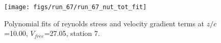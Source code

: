 \begin{figure}[H]
\centering
\texttt{[image: figs/run\_67/run\_67\_nut\_tot\_fit]}
\caption{Polynomial fits of reynolds stress and velocity gradient terms at $z/c$=10.00, $V_{free}$=27.05, station 7.}
\label{fig:run_67_nut_tot_fit}
\end{figure}



